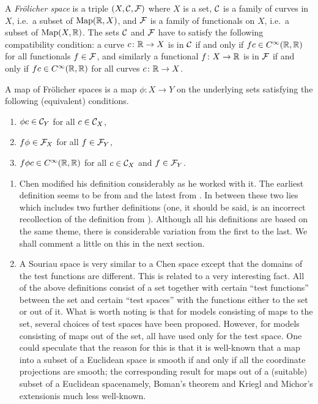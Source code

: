 \documentclass[%
12pt,%
arxiv,%
defaults
]{myclass}
\begin{document}
\begin{defn}
 A \emph{Fr\"olicher space} is a triple \((X, \mathcal{C}, \mathcal{F})\) where \(X\) is a set, \(\mathcal{C}\) is a family of curves in \(X\), i.e.~a subset of \(\operatorname{Map}(\mathbb{R}, X)\), and \(\mathcal{F}\) is a family of functionals on \(X\), i.e.~a subset of \(\operatorname{Map}(X, \mathbb{R})\).
 The sets \(\mathcal{C}\) and \(\mathcal{F}\) have to satisfy the following compatibility condition: a curve \(c \colon \mathbb{R} \to X\) is in \(\mathcal{C}\) if and only if \(f c \in C^\infty(\mathbb{R},\mathbb{R})\) for all functionals \(f \in \mathcal{F}\), and similarly a functional \(f \colon X \to \mathbb{R}\) is in \(\mathcal{F}\) if and only if \(f c \in C^\infty(\mathbb{R}, \mathbb{R})\) for all curves \(c \colon \mathbb{R} \to X\).

 A map of Fr\"olicher spaces is a map \(\phi \colon X \to Y\) on the underlying sets satisfying the following (equivalent) conditions.
 \begin{enumerate}
 \item
   \(\phi c \in \mathcal{C}_Y\) for all \(c \in \mathcal{C}_X\),
 \item
   \(f \phi \in \mathcal{F}_X\) for all \(f \in \mathcal{F}_Y\),
 \item
   \(f \phi c \in C^\infty(\mathbb{R}, \mathbb{R})\)
  for all \(c \in \mathcal{C}_X\) and \(f \in \mathcal{F}_Y\).
 \end{enumerate}
\end{defn}

\begin{remark}
\begin{enumerate}
\item
Chen modified his definition considerably as he worked with it.
The earliest definition seems to be from \cite{kc} and the latest from \cite{kc3}.
In between these two lies \cite{kc5} which includes two further definitions (one, it should be said, is an incorrect recollection of the definition from \cite{kc}).
Although all his definitions are based on the same theme, there is considerable variation from the first to the last.
We shall comment a little on this in the next section.

\item 
A Souriau space is very similar to a Chen space except that the domains of the test functions are different.
This is related to a very interesting fact.
All of the above definitions consist of a set together with certain ``test functions'' between the set and certain ``test spaces'' with the functions either to the set or out of it.
What is worth noting is that for models consisting of maps to the set, several choices of test spaces have been proposed.
However, for models consisting of maps out of the set, all have used only \R for the test space.
One could speculate that the reason for this is that it is well\hyp{}known that a map into a subset of a Euclidean space is smooth if and only if all the coordinate projections are smooth; the corresponding result for maps out of a (suitable) subset of a Euclidean space\emhyp{}namely, Boman's theorem and Kriegl and Michor's extension\emhyp{}is much less well\hyp{}known.
\end{enumerate}
\end{remark}
\end{document}
